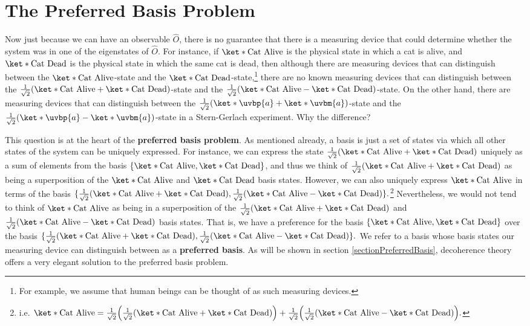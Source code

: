 \documentclass[12pt]{report}
\begin{document}
\section{The Preferred Basis Problem\protect\footnotemark}
Now just because we can have an observable $\hat{O}$, there is no guarantee that there is a measuring device that could determine whether the system was in one of the eigenstates of $\hat{O}$. For instance, if $\ket*{\text{Cat Alive}}$ is the physical state in which a cat is alive, and $\ket*{\text{Cat Dead}}$ is the physical state in which the same cat is dead, then although there are measuring devices that can distinguish between the $\ket*{\text{Cat Alive}}$-state and the $\ket*{\text{Cat Dead}}$-state,\footnote{For example, we assume that human beings can be thought of as such measuring devices.} there are no known measuring devices that can distinguish between the $\frac{1}{\sqrt{2}}(\ket*{\text{Cat Alive}}+\ket*{\text{Cat Dead}})$-state and the $\frac{1}{\sqrt{2}}(\ket*{\text{Cat Alive}}-\ket*{\text{Cat Dead}})$-state. On the other hand, there are measuring devices that can distinguish between the $\frac{1}{\sqrt{2}}(\ket*{\uvbp{a}}+\ket*{\uvbm{a}})$-state and the $\frac{1}{\sqrt{2}}(\ket*{\uvbp{a}}-\ket*{\uvbm{a}})$-state in a Stern-Gerlach experiment. Why the difference?

This question is at the heart of the \textbf{preferred basis problem}. As mentioned already, a basis is just a set of states via which all other states of the system can be uniquely expressed. For instance, we can express the state $\frac{1}{\sqrt{2}}(\ket*{\text{Cat Alive}}+\ket*{\text{Cat Dead}})$ uniquely as a sum of elements from the basis $\{\ket*{\text{Cat Alive}}, \ket*{\text{Cat Dead}}\}$, and thus we think of $\frac{1}{\sqrt{2}}(\ket*{\text{Cat Alive}}+\ket*{\text{Cat Dead}})$ as being a superposition of the $\ket*{\text{Cat Alive}}$ and $\ket*{\text{Cat Dead}}$ basis states. However, we can also uniquely express  $\ket*{\text{Cat Alive}}$ in terms of the basis $\{\frac{1}{\sqrt{2}}(\ket*{\text{Cat Alive}}+\ket*{\text{Cat Dead}}), \frac{1}{\sqrt{2}}(\ket*{\text{Cat Alive}}-\ket*{\text{Cat Dead}})\}.$\footnote{i.e. $\ket*{\text{Cat Alive}}= \frac{1}{\sqrt{2}}\Big(\frac{1}{\sqrt{2}}(\ket*{\text{Cat Alive}}+\ket*{\text{Cat Dead}})\Big)+\frac{1}{\sqrt{2}}\Big( \frac{1}{\sqrt{2}}(\ket*{\text{Cat Alive}}-\ket*{\text{Cat Dead}})\Big). $} Nevertheless, we would not tend to think of $\ket*{\text{Cat Alive}}$ as being in a superposition of the $\frac{1}{\sqrt{2}}(\ket*{\text{Cat Alive}}+\ket*{\text{Cat Dead}}) $ and $\frac{1}{\sqrt{2}}(\ket*{\text{Cat Alive}}-\ket*{\text{Cat Dead}})$ basis states. That is, we have a preference for the basis $\{\ket*{\text{Cat Alive}}, \ket*{\text{Cat Dead}}\}$ over the basis $\{\frac{1}{\sqrt{2}}(\ket*{\text{Cat Alive}}+\ket*{\text{Cat Dead}}), \frac{1}{\sqrt{2}}(\ket*{\text{Cat Alive}}-\ket*{\text{Cat Dead}})\}.$ We refer to a basis whose basis states our measuring device can distinguish between as a \textbf{preferred basis}. As will be shown in section \ref{sectionPreferredBasis}, decoherence theory offers a very elegant solution to the preferred basis problem. 
\end{document}
